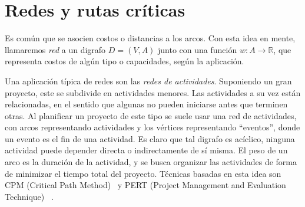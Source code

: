
\section{Redes y rutas críticas}
\label{sec:redes-rutas-criticas}

  Es común que se asocien costos o distancias a los arcos.
  Con esta idea en mente,
  llamaremos \emph{red} a un digrafo \(D = (V, A)\)
  junto con una función \(w \colon A \rightarrow \mathbb{R}\),%
  que representa costos de algún tipo
  o capacidades,
  según la aplicación.

  Una aplicación típica de redes
  son las \emph{redes de actividades}.%
  Suponiendo un gran proyecto,
  este se subdivide en actividades menores.
  Las actividades a su vez están relacionadas,
  en el sentido que algunas no pueden iniciarse
  antes que terminen otras.
  Al planificar un proyecto de este tipo
  se suele usar una red de actividades,
  con arcos representando actividades
  y los vértices representando ``eventos'',
  donde un evento es el fin de una actividad.
  Es claro que tal digrafo es acíclico,
  ninguna actividad puede depender directa o indirectamente
  de sí misma.
  El peso de un arco es la duración de la actividad,
  y se busca organizar las actividades
  de forma de minimizar el tiempo total del proyecto.
  Técnicas basadas en esta idea son
  CPM (\foreignlanguage{english}{Critical Path Method})~%
    \cite{kelley59:_CPM}%
  y PERT (\foreignlanguage{english}
	  {Project Management and Evaluation Technique})~%
    \cite{malcolm59:_PERT}.%

